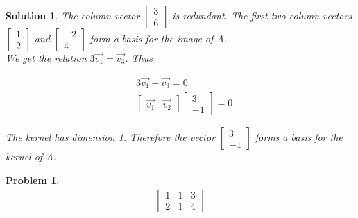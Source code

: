 \documentclass{article}
\newtheorem{problem}{Problem}
\newtheorem*{solution}{Solution}
\begin{document}
\begin{solution}
The column vector $\begin{bmatrix} 3 \\ 6 \end{bmatrix}$ is redundant. The first two column vectors $\begin{bmatrix} 1 \\ 2 \end{bmatrix}$ and $\begin{bmatrix} -2 \\ 4 \end{bmatrix}$ form a basis for the image of A. \\

We get the relation $3\vec{v_{1}} = \vec{v_{3}}$. Thus

\begin{align*}
& 3\vec{v_{1}} - \vec{v_{3}} = 0 \\
& \begin{bmatrix}\vec{v_{1}} & \vec{v_{2}} \end{bmatrix} \begin{bmatrix} 3 \\ -1 \end{bmatrix} = 0
\end{align*}

The kernel has dimension 1. Therefore the vector $\begin{bmatrix} 3 \\ -1 \end{bmatrix}$ forms a basis for the kernel of A.
\end{solution}

\begin{problem}
\begin{align*}
\begin{bmatrix}
1 & 1 & 3 \\ 2 & 1 & 4
\end{bmatrix}
\end{align*}
\end{problem}
\end{document}
